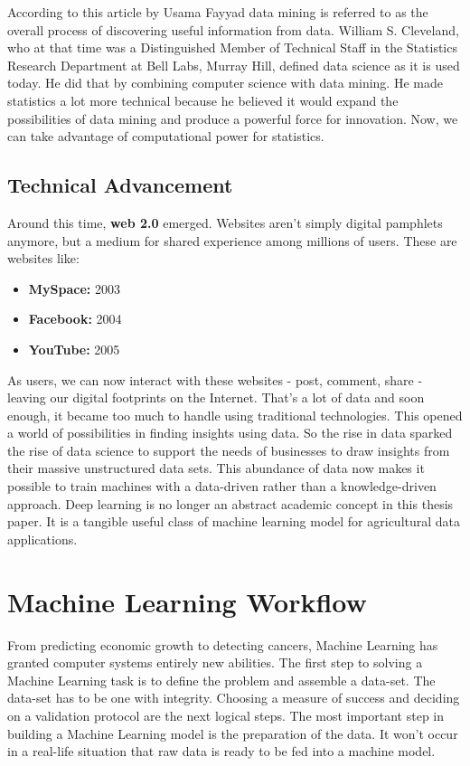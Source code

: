 According to this article by Usama Fayyad \cite{fayyad1996data} data mining is referred to  as the overall process of discovering useful information from data. William S. Cleveland, \cite{cleveland2001data}   who at that time was a Distinguished Member of Technical Staff in the Statistics Research Department at Bell Labs, Murray Hill, defined data science as it is used today. He did that by combining computer science with data mining. He made statistics a lot more technical because he believed it would expand the possibilities of data mining and produce a powerful force for innovation. Now, we can take advantage of computational power for statistics.



\subsection{Technical Advancement}
Around this time, \textbf{web 2.0} emerged. Websites aren't simply digital pamphlets anymore, but a medium for shared experience among millions of users. These are websites like:
\begin{itemize}
	\item \textbf{MySpace:} 2003
	\item \textbf{Facebook:} 2004
	\item \textbf{YouTube:} 2005	
\end{itemize}

As users, we can now interact with these websites - post, comment, share - leaving our digital footprints on the Internet. That's a lot of data and soon enough, it became too much to handle using traditional technologies. This opened a world of possibilities in finding insights using data. So the rise in data sparked the rise of data science to support the needs of businesses to draw insights from their massive unstructured data sets. This abundance of data now makes it possible to train machines with a data-driven rather than a knowledge-driven approach. Deep learning is no longer an abstract academic concept in this thesis paper. It is a tangible useful class of machine learning model for agricultural data applications.

\section{Machine Learning Workflow}
From predicting economic growth to detecting cancers, Machine Learning has granted computer systems entirely new abilities. The first step to solving a Machine Learning task is to define the problem and assemble a data-set. The data-set has to be one with integrity. Choosing a measure of success and deciding on a validation protocol are the next logical steps. The most important step in building a Machine Learning model is the preparation of the data. It won't occur in a real-life situation that raw data is ready to be fed into a machine model. 

